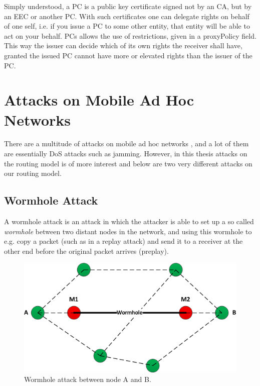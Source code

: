 Simply understood, a \ac{PC} is a public key certificate signed not
by an \ac{CA}, but by an \ac{EEC} or another \ac{PC}. With such certificates one
can delegate rights on behalf of one self, i.e. if you issue a \ac{PC} to some
other entity, that entity will be able to act on your behalf. \acp{PC} allows
the use of restrictions, given in a proxyPolicy field. This way the issuer can
decide which of its own rights the receiver shall have, granted the issued
\ac{PC} cannot have more or elevated rights than the issuer of the \ac{PC}.

\section{Attacks on Mobile Ad Hoc Networks}
There are a multitude of attacks on mobile ad hoc networks
\cite{goyal2010literature}, and a lot of them are essentially \ac{DoS} attacks
such as jamming. However, in this thesis attacks on the routing model is of
more interest and below are two very different attacks on our routing model.

\subsection{Wormhole Attack}
A wormhole attack is an attack in which the attacker is able to set up a so
called \emph{wormhole} between two distant nodes in the network, and using this
wormhole to e.g. copy a packet (such as in a replay attack) and send it to a
receiver at the other end before the original packet arrives (preplay).

\begin{figure}[h]
	\centering
  	\includegraphics[width=\textwidth]{images/wormhole_attack.png}
  	\caption{Wormhole attack between node A and B.}
	\label{fig:wormhole_attack}
\end{figure}


